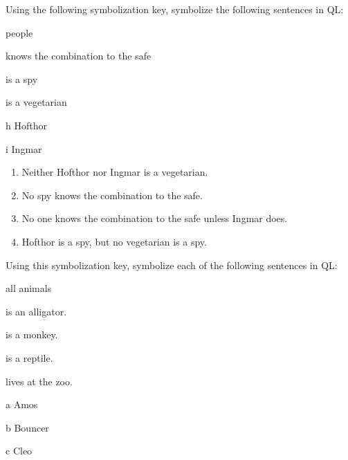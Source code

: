 \problempart
\label{pr.FOLvegetarians}
Using the following symbolization key, symbolize the following sentences in QL:
\begin{ekey}
\item[\text{domain}] people
\item[\atom{K}{x}]  knows the combination to the safe
\item[\atom{S}{x}]  is a spy
\item[\atom{V}{x}]  is a vegetarian
\item[h] Hofthor
\item[i] Ingmar
\end{ekey}
\begin{enumerate}
\item Neither Hofthor nor Ingmar is a vegetarian.
\item No spy knows the combination to the safe.
\item No one knows the combination to the safe unless Ingmar does.
\item Hofthor is a spy, but no vegetarian is a spy.
\end{enumerate}
\problempart\label{pr.FOLalligators}
Using this symbolization key, symbolize each of the following sentences in QL:
\begin{ekey}
\item[\text{domain}] all animals
\item[\atom{A}{x}]  is an alligator.
\item[\atom{M}{x}]  is a monkey.
\item[\atom{R}{x}]  is a reptile.
\item[\atom{Z}{x}]  lives at the zoo.
\item[a] Amos
\item[b] Bouncer
\item[c] Cleo
\end{ekey}
